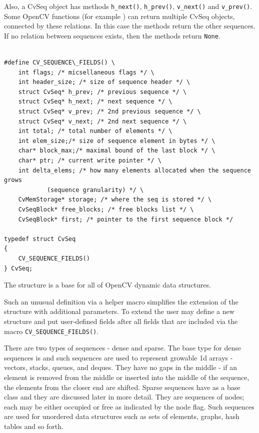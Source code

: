 Also, a CvSeq object has methods
\texttt{h\_next()},
\texttt{h\_prev()},
\texttt{v\_next()} and
\texttt{v\_prev()}.
Some OpenCV functions (for example ) can return multiple CvSeq objects, connected by these relations.
In this case the methods return the other sequences.  If no relation between sequences exists, then the methods return \texttt{None}.

\fi

\ifC
\begin{lstlisting}

#define CV_SEQUENCE\_FIELDS() \
    int flags; /* micsellaneous flags */ \
    int header_size; /* size of sequence header */ \
    struct CvSeq* h_prev; /* previous sequence */ \
    struct CvSeq* h_next; /* next sequence */ \
    struct CvSeq* v_prev; /* 2nd previous sequence */ \
    struct CvSeq* v_next; /* 2nd next sequence */ \
    int total; /* total number of elements */ \
    int elem_size;/* size of sequence element in bytes */ \
    char* block_max;/* maximal bound of the last block */ \
    char* ptr; /* current write pointer */ \
    int delta_elems; /* how many elements allocated when the sequence grows 
			(sequence granularity) */ \
    CvMemStorage* storage; /* where the seq is stored */ \
    CvSeqBlock* free_blocks; /* free blocks list */ \
    CvSeqBlock* first; /* pointer to the first sequence block */

typedef struct CvSeq
{
    CV_SEQUENCE_FIELDS()
} CvSeq;

\end{lstlisting}

The structure  is a base for all of OpenCV dynamic data structures.

Such an unusual definition via a helper macro simplifies the extension
of the structure \cross{CvSeq} with additional parameters. To extend
\cross{CvSeq} the user may define a new structure and put user-defined
fields after all \cross{CvSeq} fields that are included via the macro
\texttt{CV\_SEQUENCE\_FIELDS()}.

There are two types of sequences - dense and sparse. The base type for dense
sequences is \cross{CvSeq} and such sequences are used to represent
growable 1d arrays - vectors, stacks, queues, and deques. They have no gaps
in the middle - if an element is removed from the middle or inserted
into the middle of the sequence, the elements from the closer end are
shifted. Sparse sequences have  as a base class and they are
discussed later in more detail. They are sequences of nodes; each may be either occupied or free as indicated by the node flag. Such
sequences are used for unordered data structures such as sets of elements,
graphs, hash tables and so forth.

